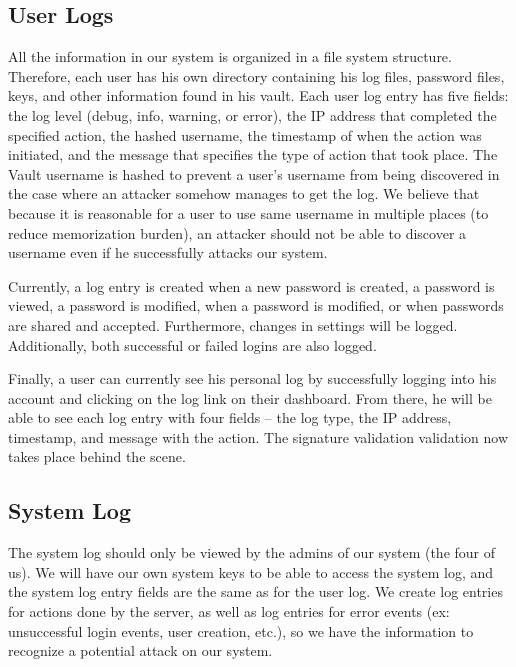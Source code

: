 \documentclass{article}
\begin{document}
\subsection{User Logs}
\par All the information in our system is organized in a file system structure. Therefore, each user has his own directory containing his log files, password files, keys, and other information found in his vault. Each user log entry has five fields: the log level (debug, info, warning, or error), the IP address that completed the specified action, the hashed username, the timestamp of when the action was initiated, and the message that specifies the type of action that took place. The Vault username is hashed to prevent a user's username from being discovered in the case where an attacker somehow manages to get the log. We believe that because it is reasonable for a user to use same username in multiple places (to reduce memorization burden), an attacker should not be able to discover a username even if he successfully attacks our system.

\par Currently, a log entry is created when a new password is created, a password is viewed, a password is modified, when a password is modified, or when passwords are shared and accepted. Furthermore, changes in settings will be logged. Additionally, both successful or failed logins are also logged.

\par Finally, a user can currently see his personal log by successfully logging into his account and clicking on the log link on their dashboard. From there, he will be able to see each log entry with four fields – the log type, the IP address, timestamp, and message with the action. The signature validation validation now takes place behind the scene.


\subsection{System Log}
The system log should only be viewed by the admins of our system (the four of us). We will have our own system keys to be able to access the system log, and the system log entry fields are the same as for the user log. We create log entries for actions done by the server, as well as log entries for error events (ex: unsuccessful login events, user creation, etc.), so we have the information to recognize a potential attack on our system.
\end{document}
